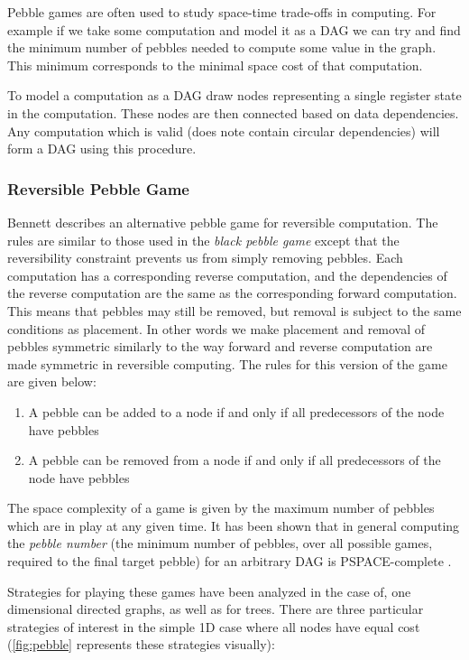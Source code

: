 Pebble games are often used to study space-time trade-offs in computing. For
example if we take some computation and model it as a DAG we can try and find
the minimum number of pebbles needed to compute some value in the graph. This
minimum corresponds to the minimal space cost of that computation.

To model a computation as a DAG draw nodes representing a single register state
in the computation.  These nodes are then connected based on data dependencies.
Any computation which is valid (does note contain circular dependencies) will
form a DAG using this procedure.

\subsubsection{Reversible Pebble Game}

Bennett\cite{Bennett:89} describes an alternative pebble game for reversible
computation. The rules are similar to those used in the \emph{black pebble
game} except that the reversibility constraint prevents us from simply removing
pebbles. Each computation has a corresponding reverse computation, and the
dependencies of the reverse computation are the same as the corresponding
forward computation. This means that pebbles may still be removed, but removal
is subject to the same conditions as placement. In other words we make
placement and removal of pebbles symmetric similarly to the way forward and
reverse computation are made symmetric in reversible computing.  The rules for
this version of the game are given below:

\begin{enumerate}

  \item A pebble can be added to a node if and only if all predecessors of the
    node have pebbles

  \item A pebble can be removed from a node if and only if all predecessors of
    the node have pebbles

\end{enumerate}

The space complexity of a game is given by the maximum number of pebbles which
are in play at any given time. It has been shown that in general computing the
\emph{pebble number} (the minimum number of pebbles, over all possible games,
required to the final target pebble) for an arbitrary DAG is PSPACE-complete
\cite{chan13}.

Strategies for playing these games have been analyzed in the case of, one
dimensional directed graphs, as well as for trees\cite{peb16}.  There are three
particular strategies of interest in the simple 1D case where all nodes have
equal cost (\cref{fig:pebble} represents these strategies visually):

